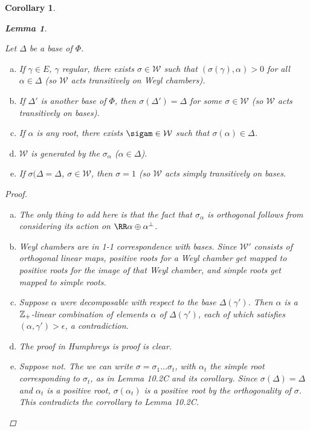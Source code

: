 \documentclass{article}
\newtheorem{lem}[thm]{Lemma}
\newtheorem{cor}[thm]{Corollary}
\begin{document}
\begin{cor}
\begin{lem}
\begin{thm} Let $\Delta$ be a base of $\Phi$.
\begin{enumerate}[(a)]
\item If $\gamma \in E$, $\gamma$ regular, there exists $\sigma \in \mathcal W$ such that $(\sigma(\gamma), \alpha) > 0$ for all $\alpha \in \Delta$ (so $\mathcal W$ acts transitively on Weyl chambers).
\item If $\Delta'$ is another base of $\Phi$, then $\sigma(\Delta') = \Delta$ for some $\sigma \in \mathcal W$ (so $\mathcal W$ acts transitively on bases).
\item If $\alpha$ is any root, there exists $\sigam \in \mathcal W$ such that $\sigma(\alpha) \in \Delta$.
\item $\mathcal W$ is generated by the $\sigma_\alpha$ ($\alpha \in \Delta$).
\item If $\sigma(\Delta = \Delta$, $\sigma \in \mathcal W$, then $\sigma = 1$ (so $\mathcal W$ acts simply transitively on bases.
\end{enumerate}
\end{thm}
\begin{proof}
\begin{enumerate}[(a)]
\item The only thing to add here is that  the fact that $\sigma_\alpha$ is orthogonal follows from considering its action on $\RR \alpha \oplus \alpha^\perp$.
\item Weyl chambers are in 1-1 correspondence with bases.  Since $\mathcal W'$ consists of orthogonal linear maps,  positive roots for a Weyl chamber get mapped to positive roots for the image of that Weyl chamber, and simple roots get mapped to simple roots.
\item Suppose $\alpha$ were decomposable with respect to the base $\Delta(\gamma')$.  Then $\alpha$ is a $\mathbb{Z}_+$-linear combination of elements $\alpha$ of $\Delta(\gamma')$, each of which satisfies $(\alpha, \gamma') > \epsilon$, a contradiction.
\item The proof in Humphreys is proof is clear.
\item Suppose not.  The we can write $\sigma = \sigma_1 \ldots \sigma_t$, with $\alpha_t$ the simple root corresponding to $\sigma_t$, as in Lemma 10.2C and its corollary.  Since $\sigma(\Delta) = \Delta$ and $\alpha_t$ is a positive root,  $\sigma(\alpha_t)$ is a positive root by the orthogonality of $\sigma$.  This contradicts the corrollary to Lemma 10.2C.
\end{enumerate}
\end{proof}


\end{lem}
\end{cor}
\end{document}
